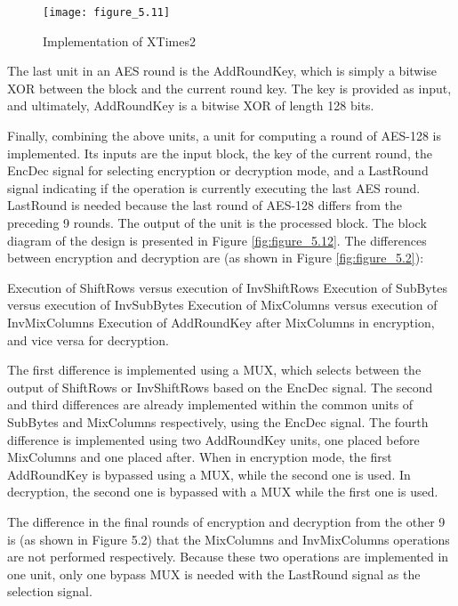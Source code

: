 \begin{figure}
\centering
\texttt{[image: figure\_5.11]}\\
\caption{ Implementation of XTimes2 }
\label{fig:figure_5.11}
\end{figure}


The last unit in an AES round is the AddRoundKey, which is simply a bitwise XOR between the block and the current round key. The key is provided as input, and ultimately, AddRoundKey is a bitwise XOR of length 128 bits.

Finally, combining the above units, a unit for computing a round of AES-128 is implemented. Its inputs are the input block, the key of the current round, the EncDec signal for selecting encryption or decryption mode, and a LastRound signal indicating if the operation is currently executing the last AES round. LastRound is needed because the last round of AES-128 differs from the preceding 9 rounds. The output of the unit is the processed block. The block diagram of the design is presented in Figure \ref{fig:figure_5.12}. The differences between encryption and decryption are (as shown in Figure \ref{fig:figure_5.2}):
\begin{outline}[enumerate]
\1 Execution of ShiftRows versus execution of InvShiftRows
\1 Execution of SubBytes  versus execution of InvSubBytes
\1 Execution of MixColumns  versus execution of InvMixColumns
\1 Execution of AddRoundKey after MixColumns in encryption, and vice versa for decryption.
\end{outline}
The first difference is implemented using a MUX, which selects between the output of ShiftRows or InvShiftRows based on the EncDec signal. The second and third differences are already implemented within the common units of SubBytes and MixColumns respectively, using the EncDec signal. The fourth difference is implemented using two AddRoundKey units, one placed before MixColumns and one placed after. When in encryption mode, the first AddRoundKey is bypassed using a MUX, while the second one is used. In decryption, the second one is bypassed with a MUX while the first one is used.

The difference in the final rounds of encryption and decryption from the other 9 is (as shown in Figure 5.2) that the MixColumns and InvMixColumns operations are not performed respectively. Because these two operations are implemented in one unit, only one bypass MUX is needed with the LastRound signal as the selection signal.

